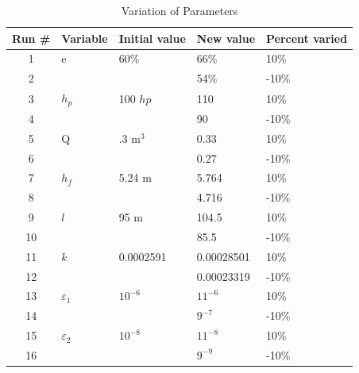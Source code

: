 \documentclass[titlepage,11pt]{article}
\begin{document}
\begin{table}[!h]
\begin{center}
\caption{Variation of Parameters} \vspace{.2in}
\begin{tabular}{|c|l|l|l|l|}\hline
\bf Run \# & \multicolumn{1}{c|}{\bf Variable} &
\multicolumn{1}{c|}{\bf Initial value} & \multicolumn{1}{c|}{\bf New
value} & \multicolumn{1}{c|}{\bf Percent varied} \\ \hline
1 & e & 60\% & 66\% & 10\% \\
2 &  &  & 54\% & -10\% \\ \hline
3 & $h_p$ & 100 $hp$ & 110 & 10\% \\
4 &  &  & 90 & -10\% \\ \hline
5 & Q & .3 m$^3$ & 0.33 & 10\% \\
6 &  &  & 0.27 & -10\% \\ \hline
7 & $h_f$ & 5.24 m & 5.764 & 10\% \\
8 &  &  & 4.716 & -10\% \\ \hline
9 & $l$ & 95 m & 104.5 & 10\% \\
10 &  &  & 85.5 & -10\% \\ \hline
11 & $k$ & 0.0002591 & 0.00028501 & 10\% \\
12 &  &  & 0.00023319 & -10\% \\ \hline
13 & $\varepsilon_1$ & $10^{-6}$ & $11^{-6}$ & 10\% \\
14 &  &  & $9^{-7}$ & -10\% \\ \hline
15 & $\varepsilon_2$ & $10^{-8}$ & $11^{-8}$ & 10\% \\
16 &  &  & $9^{-9}$ & -10\% \\ \hline
\end{tabular}
\end{center}
\end{table}

\newpage
\end{document}
